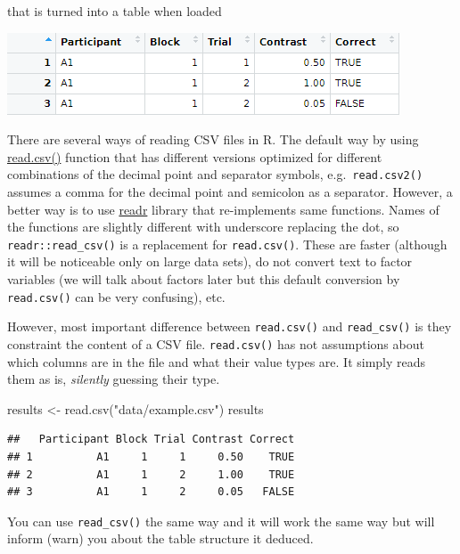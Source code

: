 \documentclass[
]{book}
\newenvironment{Shaded}{\begin{snugshade}}{\end{snugshade}}
\newcommand{\FunctionTok}[1]{\textcolor[rgb]{0.00,0.00,0.00}{#1}}
\newcommand{\NormalTok}[1]{#1}
\newcommand{\OtherTok}[1]{\textcolor[rgb]{0.56,0.35,0.01}{#1}}
\newcommand{\StringTok}[1]{\textcolor[rgb]{0.31,0.60,0.02}{#1}}
\begin{document}
that is turned into a table when loaded

\begin{center}\includegraphics[width=0.7\linewidth]{images/results-csv-table} \end{center}

There are several ways of reading CSV files in R. The default way by using \href{https://stat.ethz.ch/R-manual/R-devel/library/utils/html/read.table.html}{read.csv()} function that has different versions optimized for different combinations of the decimal point and separator symbols, e.g.~\texttt{read.csv2()} assumes a comma for the decimal point and semicolon as a separator. However, a better way is to use \href{https://readr.tidyverse.org/}{readr} library that re-implements same functions. Names of the functions are slightly different with underscore replacing the dot, so \texttt{readr::read\_csv()} is a replacement for \texttt{read.csv()}. These are faster (although it will be noticeable only on large data sets), do not convert text to factor variables (we will talk about factors later but this default conversion by \texttt{read.csv()} can be very confusing), etc.

However, most important difference between \texttt{read.csv()} and \texttt{read\_csv()} is they constraint the content of a CSV file. \texttt{read.csv()} has not assumptions about which columns are in the file and what their value types are. It simply reads them as is, \emph{silently} guessing their type.

\begin{Shaded}
\begin{Highlighting}[]
\NormalTok{results }\OtherTok{\textless{}{-}} \FunctionTok{read.csv}\NormalTok{(}\StringTok{"data/example.csv"}\NormalTok{)}
\NormalTok{results}
\end{Highlighting}
\end{Shaded}

\begin{verbatim}
##   Participant Block Trial Contrast Correct
## 1          A1     1     1     0.50    TRUE
## 2          A1     1     2     1.00    TRUE
## 3          A1     1     2     0.05   FALSE
\end{verbatim}

You can use \texttt{read\_csv()} the same way and it will work the same way but will inform (warn) you about the table structure it deduced.
\end{document}
